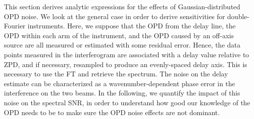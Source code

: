 This section derives analytic expressions for the effects of Gaussian-distributed OPD noise. We look at the general case in order to derive sensitivities for double-Fourier instruments. Here, we suppose that the OPD from the delay line, the OPD within each arm of the instrument, and the OPD caused by an off-axis source are all measured or estimated with some residual error. Hence, the data points measured in the interferogram are associated with a delay value relative to ZPD, and if necessary, resampled to produce an evenly-spaced delay axis. This is necessary to use the FT and retrieve the spectrum. The noise on the delay estimate can be
characterized as a wavenumber-dependent phase error in the interference on the two beams. In the following, we quantify the impact of this noise on the spectral SNR, in order to understand how good our knowledge of the OPD needs to be to make sure the OPD noise effects are not dominant.



